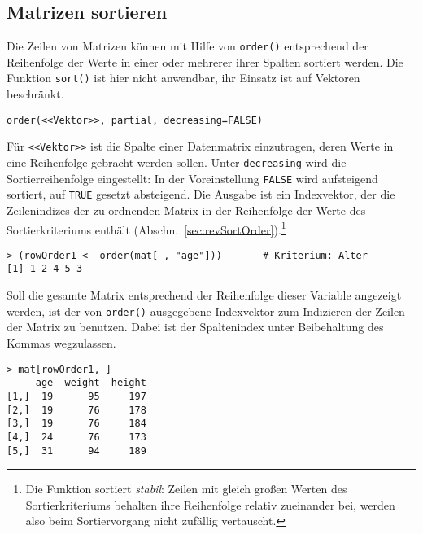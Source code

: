 \subsection{Matrizen sortieren}
\label{sec:sortMat}

Die Zeilen von Matrizen können mit Hilfe von \lstinline!order()! entsprechend der Reihenfolge der Werte in einer oder mehrerer ihrer Spalten sortiert werden. Die Funktion \lstinline!sort()! ist hier nicht anwendbar, ihr Einsatz ist auf Vektoren beschränkt.
\begin{lstlisting}
order(<<Vektor>>, partial, decreasing=FALSE)
\end{lstlisting}

Für \lstinline!<<Vektor>>! ist die Spalte einer Datenmatrix einzutragen, deren Werte in eine Reihenfolge gebracht werden sollen. Unter \lstinline!decreasing! wird die Sortierreihenfolge eingestellt: In der Voreinstellung \lstinline!FALSE! wird aufsteigend sortiert, auf \lstinline!TRUE! gesetzt absteigend. Die Ausgabe ist ein Indexvektor, der die Zeilenindizes der zu ordnenden Matrix in der Reihenfolge der Werte des Sortierkriteriums enthält (Abschn.\ \ref{sec:revSortOrder}).\footnote{Die Funktion sortiert \emph{stabil}: Zeilen mit gleich großen Werten des Sortierkriteriums behalten ihre Reihenfolge relativ zueinander bei, werden also beim Sortiervorgang nicht zufällig vertauscht.}
\begin{lstlisting}
> (rowOrder1 <- order(mat[ , "age"]))       # Kriterium: Alter
[1] 1 2 4 5 3
\end{lstlisting}

Soll die gesamte Matrix entsprechend der Reihenfolge dieser Variable angezeigt werden, ist der von \lstinline!order()! ausgegebene Indexvektor zum Indizieren der Zeilen der Matrix zu benutzen. Dabei ist der Spaltenindex unter Beibehaltung des Kommas wegzulassen.
\begin{lstlisting}
> mat[rowOrder1, ]
     age  weight  height
[1,]  19      95     197
[2,]  19      76     178
[3,]  19      76     184
[4,]  24      76     173
[5,]  31      94     189
\end{lstlisting}


